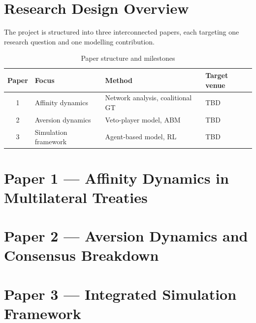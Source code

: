 \section{Research Design Overview}
\label{sec:design}

The project is structured into three interconnected papers, each targeting one research
question and one modelling contribution.

\begin{table}[htbp]
  \centering
  \caption{Paper structure and milestones}
  \label{tab:papers}
  \begin{tabular}{clll}
    \toprule
    \textbf{Paper} & \textbf{Focus} & \textbf{Method} & \textbf{Target venue} \\
    \midrule
    1 & Affinity dynamics     & Network analysis, coalitional GT    & TBD \\
    2 & Aversion dynamics     & Veto-player model, ABM              & TBD \\
    3 & Simulation framework  & Agent-based model, RL               & TBD \\
    \bottomrule
  \end{tabular}
\end{table}

\section{Paper 1 — Affinity Dynamics in Multilateral Treaties}
\label{sec:paper1}


\section{Paper 2 — Aversion Dynamics and Consensus Breakdown}
\label{sec:paper2}


\section{Paper 3 — Integrated Simulation Framework}
\label{sec:paper3}

